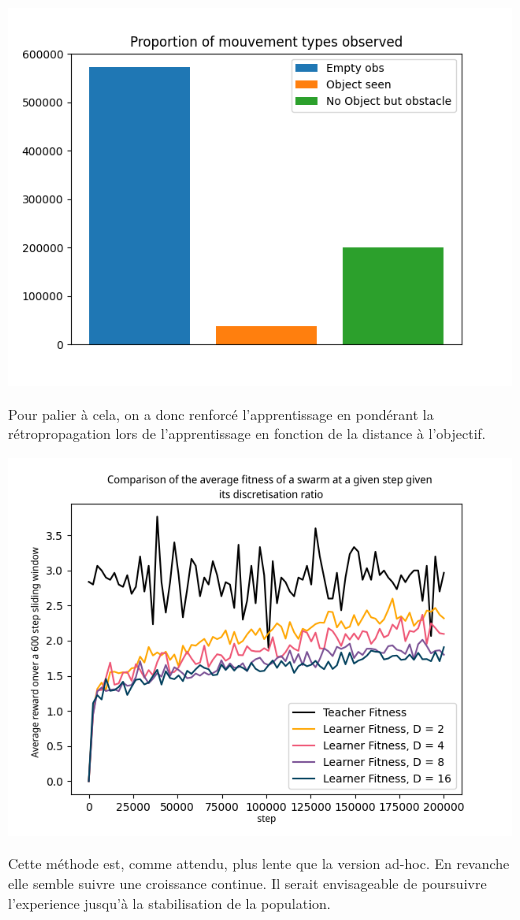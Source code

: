 \documentclass[a4paper, 12pt]{report}
\begin{document}
\begin{center}
\includegraphics[scale = 0.5]{Proportions}
\end{center}	

	Pour palier à cela, on a donc renforcé l'apprentissage en pondérant la rétropropagation lors de l'apprentissage en fonction de la distance à l'objectif.

\begin{center}
	\includegraphics{averageComparisons}
\end{center}	
	
Cette méthode est, comme attendu, plus lente que la version ad-hoc. En revanche elle semble suivre une croissance continue. Il serait envisageable de poursuivre l'experience jusqu'à la stabilisation de la population.
	
\end{document}
